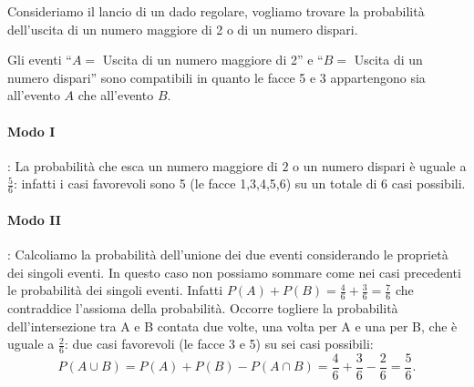 \begin{esempio}
Consideriamo il lancio di un dado regolare, vogliamo trovare la probabilità 
dell'uscita di un numero maggiore di 2 o di un numero dispari.

Gli eventi ``$ A= $ Uscita di un numero maggiore di 2'' e ``$ B= $ Uscita di 
un 
numero dispari'' sono compatibili in quanto le facce 5 e 3 appartengono sia 
all'evento $A$ che all'evento $B$.

\paragraph{Modo I}: La probabilità che esca un numero maggiore di $2$ o un 
numero dispari è uguale a $\frac 5 6$: infatti i casi favorevoli sono 5 (le 
facce 1,3,4,5,6) su un totale di $6$ casi possibili.
\paragraph{Modo II}: Calcoliamo la probabilità dell'unione dei due eventi 
considerando le proprietà dei singoli eventi. In questo caso non possiamo 
sommare come nei casi precedenti le probabilità dei singoli eventi. Infatti 
$P(A)+P(B)=\frac 4 6+\frac 3 6=\frac 7 6$ che contraddice l'assioma della 
probabilità. Occorre togliere la probabilità dell'intersezione tra A e B 
contata 
due volte, una volta per A e una per B, che è uguale a $\frac 2 6$: due casi 
favorevoli (le facce 3 e 5) su sei casi possibili: \[P(A\cup 
B)=P(A)+P(B)-P(A\cap B)=\frac 4 6+\frac 3 6-\frac 2 6=\frac 5 6.\]
\end{esempio}

